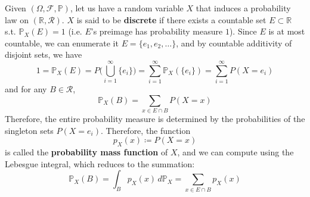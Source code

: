 \documentclass{article}
\begin{document}
      \begin{definition}
        Given $(\Omega, \mathcal{F}, \mathbb{P})$, let us have a random variable $X$ that induces a probability law on $(\mathbb{R}, \mathcal{R})$. $X$ is said to be \textbf{discrete} if there exists a countable set $E \subset \mathbb{R}$ s.t. $\mathbb{P}_X (E) = 1$ (i.e. $E$'s preimage has probability measure $1$). Since $E$ is at most countable, we can enumerate it $E = \{e_1, e_2, \ldots\}$, and by countable additivity of disjoint sets, we have 
        \begin{equation}
          1 = \mathbb{P}_X (E) = P\bigg( \bigcup_{i=1}^\infty \{e_i\} \bigg) = \sum_{i=1}^\infty \mathbb{P}_X (\{e_i\}) = \sum_{i=1}^\infty P(X = e_i)
        \end{equation}
        and for any $B \in \mathcal{R}$, 
        \begin{equation}
          \mathbb{P}_X (B) = \sum_{x \in E \cap B} P(X = x)
        \end{equation}
        Therefore, the entire probability measure is determined by the probabilities of the singleton sets $P(X = e_i)$. Therefore, the function 
        \begin{equation}
          p_X (x) \coloneqq P(X = x)
        \end{equation}
        is called the \textbf{probability mass function} of $X$, and we can compute using the Lebesgue integral, which reduces to the summation: 
        \begin{equation}
          \mathbb{P}_X (B) = \int_B p_X (x) \, d \mathbb{P}_X = \sum_{x \in E \cap B} p_X (x)
        \end{equation}
      \end{definition}
\end{document}
